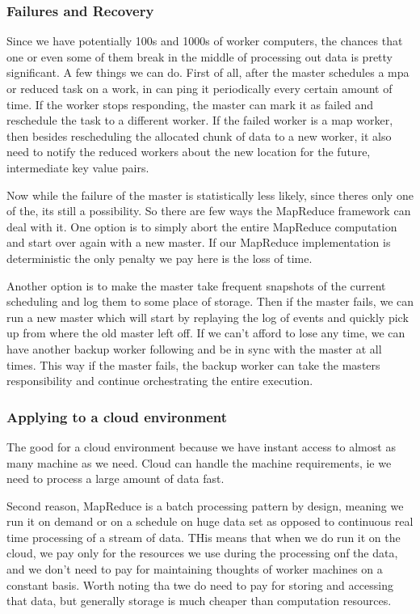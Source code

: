 \subsubsection{Failures and Recovery}
Since we have potentially 100s and 1000s of worker computers, the chances that one or even some of them break in the middle of processing out data is pretty significant.
A few things we can do.
First of all, after the master schedules a mpa or reduced task on a work, in can ping it periodically every certain amount of time.
If the worker stops responding, the master can mark it as failed and reschedule the task to a different worker.
If the failed worker is a map worker, then besides rescheduling the allocated chunk of data to a new worker, it also need to notify the reduced workers about the new location for the future, intermediate key value pairs.

Now while the failure of the master is statistically less likely, since theres only one of the, its still a possibility.
So there are few ways the MapReduce framework can deal with it.
One option is to simply abort the entire MapReduce computation and start over again with a new master.
If our MapReduce implementation is deterministic the only penalty we pay here is the loss of time.

Another option is to make the master take frequent snapshots of the current scheduling and log them to some place of storage.
Then if the master fails, we can run a new master which will start by replaying the log of events and quickly pick up from where the old master left off.
If we can't afford to lose any time, we can have another backup worker following and be in sync with the master at all times.
This way if the master fails, the backup worker can take the masters responsibility and continue orchestrating the entire execution.

\subsubsection{Applying to a cloud environment}
The good for a cloud environment because we have instant access to almost as many machine as we need.
Cloud can handle the machine requirements, ie we need to process a large amount of data fast.

Second reason, MapReduce is a batch processing pattern by design, meaning we run it on demand or on a schedule on huge data set as opposed to continuous real time processing of a stream of data.
THis means that when we do run it on the cloud, we pay only for the resources we use during the processing onf the data, and we don't need to pay for maintaining thoughts of worker machines on a constant basis.
Worth noting tha twe do need to pay for storing and accessing that data, but generally storage is much cheaper than computation resources.


